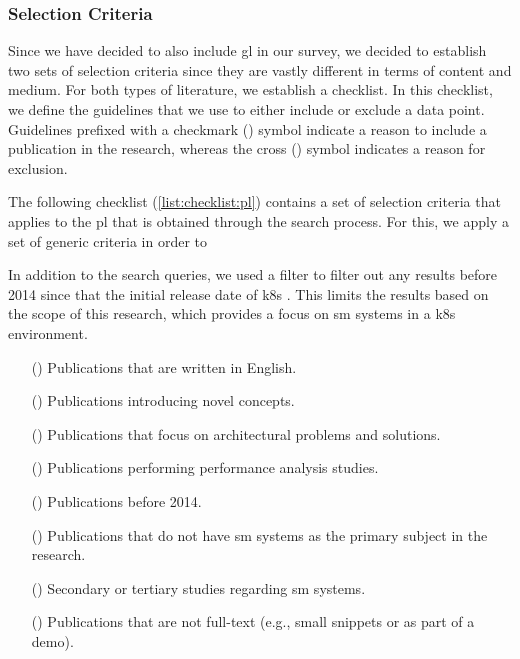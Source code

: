 



\subsubsection{Selection Criteria}
\label{sec:survey:methodology:review-protocol:selection-criteria}
Since we have decided to also include \gls{gl} in our survey, we decided to establish two sets of selection criteria since they are vastly different in terms of content and medium. For both types of literature, we establish a checklist. In this checklist, we define the guidelines that we use to either include or exclude a data point. Guidelines prefixed with a checkmark (\cmark) symbol indicate a reason to include a publication in the research, whereas the cross (\xmark) symbol indicates a reason for exclusion. 

The following checklist (\cref{list:checklist:pl}) contains a set of selection criteria that applies to the \gls{pl} that is obtained through the search process. For this, we apply a set of generic criteria in order to 

In addition to the search queries, we used a filter to filter out any results before 2014 since that the initial release date of \gls{k8s} \cite{kubernetes-overview}. This limits the results based on the scope of this research, which provides a focus on \gls{sm} systems in a \gls{k8s} environment.

\begin{itemize}
    \item[(\cmark)] Publications that are written in English.
    \item[(\cmark)] Publications introducing novel concepts.
    \item[(\cmark)] Publications that focus on architectural problems and solutions.
    \item[(\cmark)] Publications performing performance analysis studies.
    
    \item[(\xmark)] Publications before 2014. 
    \item[(\xmark)] Publications that do not have \gls{sm} systems as the primary subject in the research. 
    \item[(\xmark)] Secondary or tertiary studies regarding \gls{sm} systems.
    \item[(\xmark)] Publications that are not full-text (e.g., small snippets or as part of a demo).
    
    \label{list:checklist:pl}
\end{itemize}


